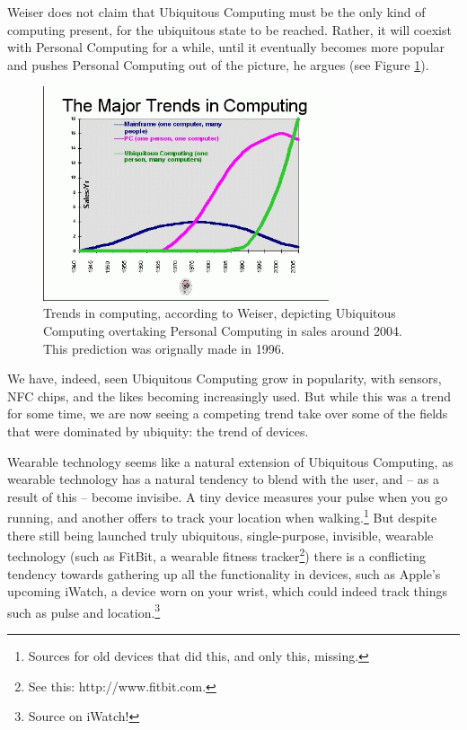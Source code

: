Weiser does not claim that Ubiquitous Computing must be the only kind of computing present, for the ubiquitous state to be reached.
Rather, it will coexist with Personal Computing for a while, until it eventually becomes more popular and pushes Personal Computing
out of the picture, he argues (see Figure \ref{fig:trends-graph}).

\begin{figure}[ht]
	\centering
	\includegraphics[width=0.75\textwidth]{multipurpose/trends-graph}
	\caption{Trends in computing, according to Weiser, depicting Ubiquitous Computing overtaking Personal Computing in sales around
		2004. This prediction was orignally made in 1996.\cite{weisernomadic}}
	\label{fig:trends-graph}
\end{figure}

We have, indeed, seen Ubiquitous Computing grow in popularity, with sensors, NFC chips, and the likes becoming increasingly used. But
while this was a trend for some time, we are now seeing a competing trend take over some of the fields that were dominated by ubiquity:
the trend of devices.

Wearable technology seems like a natural extension of Ubiquitous Computing, as wearable technology has a natural tendency to blend with
the user, and -- as a result of this -- become invisibe. A tiny device measures your pulse when you go running, and another offers
to track your location when walking.\footnote{Sources for old devices that did this, and only this, missing.} But despite there still
being launched truly ubiquitous, single-purpose, invisible, wearable technology (such as FitBit, a wearable fitness tracker\footnote{See
this: http://www.fitbit.com.}) there is a conflicting tendency towards gathering up all the functionality in devices, such as Apple's
upcoming iWatch, a device worn on your wrist, which could indeed track things such as pulse and location.\footnote{Source on iWatch!}

